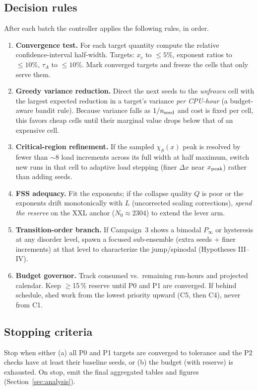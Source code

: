 \documentclass[11pt]{article}
\newcommand{\Pinf}{P_\infty}
\begin{document}
\subsection{Decision rules}

After each batch the controller applies the following rules, in order.
\begin{enumerate}
\item \textbf{Convergence test.} For each target quantity compute the relative
confidence-interval half-width. Targets: $x_c$ to $\le 5\%$, exponent ratios to
$\le 10\%$, $\tau_A$ to $\le 10\%$. Mark converged targets and freeze the cells that
only serve them.
\item \textbf{Greedy variance reduction.} Direct the next seeds to the \emph{unfrozen}
cell with the largest expected reduction in a target's variance \emph{per CPU-hour}
(a budget-aware bandit rule). Because variance falls as $1/n_{\rm seed}$ and cost is
fixed per cell, this favors cheap cells until their marginal value drops below that of
an expensive cell.
\item \textbf{Critical-region refinement.} If the sampled $\chi_S(x)$ peak is resolved
by fewer than $\sim$8 load increments across its full width at half maximum, switch new
runs in that cell to adaptive load stepping (finer $\Delta x$ near $x_{\rm peak}$)
rather than adding seeds.
\item \textbf{FSS adequacy.} Fit the exponents; if the collapse quality $Q$ is poor or
the exponents drift monotonically with $L$ (uncorrected scaling corrections),
\emph{spend the reserve} on the XXL anchor ($N_0\approx2304$) to extend the lever arm.
\item \textbf{Transition-order branch.} If Campaign~3 shows a bimodal $\Pinf$ or
hysteresis at any disorder level, spawn a focused sub-ensemble (extra seeds + finer
increments) at that level to characterize the jump/spinodal (Hypotheses III--IV).
\item \textbf{Budget governor.} Track consumed vs.\ remaining run-hours and projected
calendar. Keep $\ge$15\,\% reserve until P0 and P1 are converged. If behind schedule,
shed work from the lowest priority upward (C5, then C4), never from C1.
\end{enumerate}

\subsection{Stopping criteria}

Stop when either (a) all P0 and P1 targets are converged to tolerance and the P2 checks
have at least their baseline seeds, or (b) the budget (with reserve) is exhausted. On
stop, emit the final aggregated tables and figures (Section~\ref{sec:analysis}).
\end{document}
